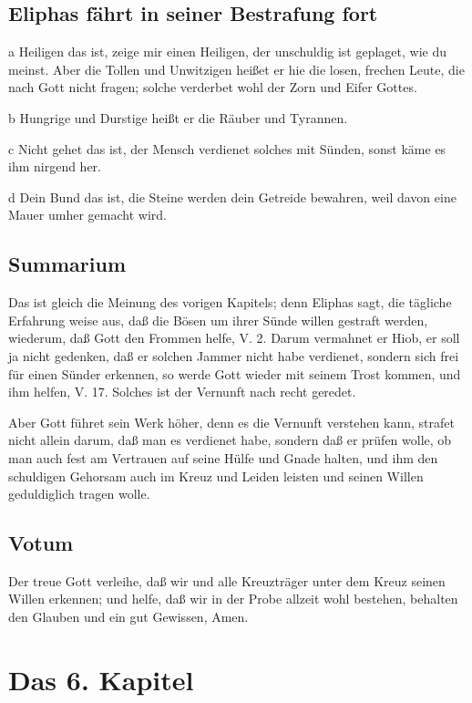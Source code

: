 \section{Eliphas fährt in seiner Bestrafung fort}

a Heiligen das ist, zeige mir einen Heiligen, der unschuldig ist geplaget, wie du meinst. Aber die Tollen und Unwitzigen heißet er hie die losen, frechen Leute, die nach Gott nicht fragen; solche verderbet wohl der Zorn und Eifer Gottes.

b Hungrige und Durstige heißt er die Räuber und Tyrannen.

c Nicht gehet das ist, der Mensch verdienet solches mit Sünden, sonst käme es ihm nirgend her.

d Dein Bund das ist, die Steine werden dein Getreide bewahren, weil davon eine Mauer umher gemacht wird.

\section{Summarium}

Das ist gleich die Meinung des vorigen Kapitels; denn Eliphas sagt, die tägliche Erfahrung weise aus, daß die Bösen um ihrer Sünde willen gestraft werden, wiederum, daß Gott den Frommen helfe, V. 2. Darum vermahnet er Hiob, er soll ja nicht gedenken, daß er solchen Jammer nicht habe verdienet, sondern sich frei
für einen Sünder erkennen, so werde Gott wieder mit seinem Trost kommen, und ihm helfen, V. 17. Solches ist der Vernunft nach recht geredet.

Aber Gott führet sein Werk höher, denn es die Vernunft verstehen kann, strafet nicht allein darum, daß man es verdienet habe, sondern daß er prüfen wolle, ob man auch fest am Vertrauen auf seine Hülfe und Gnade halten, und ihm den schuldigen Gehorsam auch im Kreuz und Leiden leisten und seinen Willen geduldiglich tragen wolle.

\section{Votum}

Der treue Gott verleihe, daß wir und alle Kreuzträger unter dem Kreuz seinen Willen erkennen; und helfe, daß wir in der Probe allzeit wohl bestehen, behalten den Glauben und ein gut Gewissen, Amen.

\chapter{Das 6. Kapitel}

